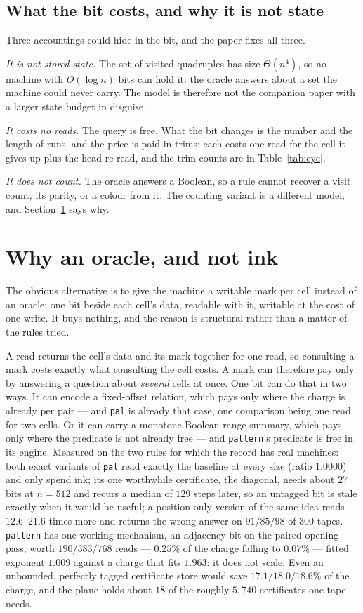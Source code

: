 \documentclass[11pt]{article}
\theoremstyle{remark}
\begin{document}
\subsection{What the bit costs, and why it is not state}\label{sec:account}

Three accountings could hide in the bit, and the paper fixes all three.

\emph{It is not stored state.} The set of visited quadruples has size $\Theta(n^{4})$, so no machine with
$O(\log n)$ bits can hold it: the oracle answers about a set the machine could never carry. The model is
therefore not the companion paper with a larger state budget in disguise.

\emph{It costs no reads.} The query is free. What the bit changes is the number and the length of runs, and
the price is paid in trims: each costs one read for the cell it gives up plus the head re-read, and the trim
counts are in Table~\ref{tab:cyc}.

\emph{It does not count.} The oracle answers a Boolean, so a rule cannot recover a visit count, its parity,
or a colour from it. The counting variant is a different model, and Section~\ref{sec:not} says why.

\section{Why an oracle, and not ink}\label{sec:not}

The obvious alternative is to give the machine a writable mark per cell instead of an oracle: one bit beside
each cell's data, readable with it, writable at the cost of one write. It buys nothing, and the reason is
structural rather than a matter of the rules tried.

A read returns the cell's data and its mark together for one read, so consulting a mark costs exactly what
consulting the cell costs. A mark can therefore pay only by answering a question about \emph{several} cells
at once. One bit can do that in two ways. It can encode a fixed-offset relation, which pays only where the
charge is already per pair --- and \texttt{pal} is already that case, one comparison being one read for two
cells. Or it can carry a monotone Boolean range summary, which pays only where the predicate is not already
free --- and \texttt{pattern}'s predicate is free in its engine. Measured on the two rules for which the record
has real machines: both exact variants of \texttt{pal} read exactly the baseline at every size (ratio $1.0000$)
and only spend ink; its one worthwhile certificate, the diagonal, needs about $27$ bits at $n=512$ and recurs
a median of $129$ steps later, so an untagged bit is stale exactly when it would be useful; a position-only
version of the same idea reads $12.6$--$21.6$ times more and returns the wrong answer on $91/85/98$ of $300$
tapes. \texttt{pattern} has one working mechanism, an adjacency bit on the paired opening pass, worth
$190/383/768$ reads --- $0.25\%$ of the charge falling to $0.07\%$ --- fitted exponent $1.009$ against a
charge that fits $1.963$: it does not scale. Even an unbounded, perfectly tagged certificate store would save
$17.1/18.0/18.6\%$ of the charge, and the plane holds about $18$ of the roughly $5{,}740$ certificates one
tape needs.
\end{document}
